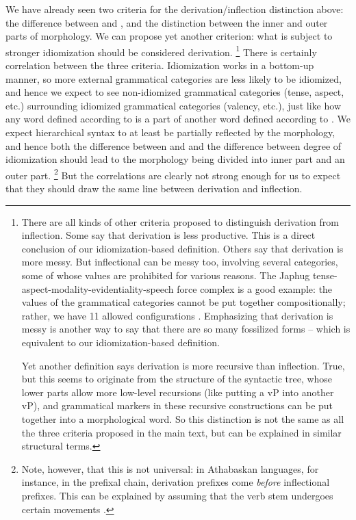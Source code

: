 \documentclass[a4paper, oneside, scheme=plain, 12pt]{article}
\newcommand*{\citepage}[1]{p.~{#1}}
\begin{document}
We have already seen two criteria for the derivation/inflection distinction above:
the difference between  and ,
and the distinction between the inner and outer parts of morphology.
We can propose yet another criterion:
what is subject to stronger idiomization should be considered derivation.%
\footnote{
    There are all kinds of other criteria proposed to distinguish derivation from inflection.
    Some say that derivation is less productive.
    This is a direct conclusion of our idiomization-based definition.
    Others say that derivation is more messy.
    But inflectional can be messy too,
    involving several categories, some of whose values are prohibited for various reasons.
    The Japhug tense-aspect-modality-evidentiality-speech force complex is a good example:
    the values of the grammatical categories cannot be put together compositionally;
    rather, we have 11 allowed configurations \citep[\citepage{1082}]{jacques2021grammar}.
    Emphasizing that derivation is messy is another way to say that there are so many fossilized forms --
    which is equivalent to our idiomization-based definition.
    
    Yet another definition says derivation is more recursive than inflection.
    True, but this seems to originate from the structure of the syntactic tree,
    whose lower parts allow more low-level recursions (like putting a vP into another vP),
    and grammatical markers in these recursive constructions can be put together into a morphological word.
    So this distinction is not the same as all the three criteria proposed in the main text,
    but can be explained in similar structural terms.
}
There is certainly correlation between the three criteria.
Idiomization works in a bottom-up manner,
so more external grammatical categories are less likely to be idiomized,
and hence we expect to see non-idiomized grammatical categories (tense, aspect, etc.)
surrounding idiomized grammatical categories (valency, etc.),
just like how any word defined according to 
is a part of another word defined according to .
We expect hierarchical syntax to at least be partially reflected by the morphology,
and hence both the difference between  and 
and the difference between degree of idiomization
should lead to the morphology being divided into inner part and an outer part.%
\footnote{
    Note, however, that this is not universal:
    in Athabaskan languages, for instance, in the prefixal chain,
    derivation prefixes come \emph{before} inflectional prefixes.
    This can be explained by assuming that the verb stem undergoes certain movements
    \citep[\citepage{78}]{rice2000athapaskan}.
}
But the correlations are clearly not strong enough for us to expect that they should draw the same line between derivation and inflection.
\end{document}
